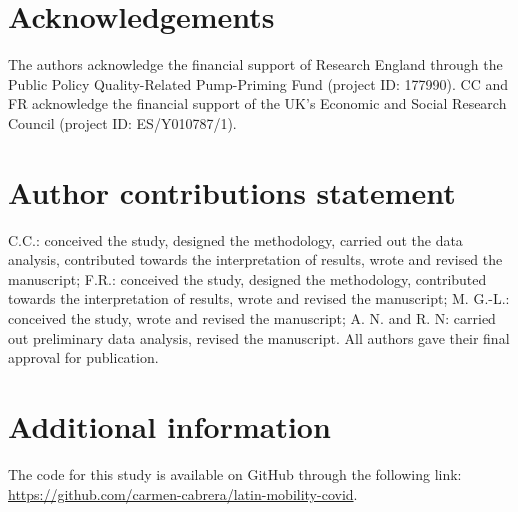 \documentclass[fleqn,10pt]{wlscirep}
\begin{document}


\section*{Acknowledgements}

The authors acknowledge the financial support of Research England through the Public Policy Quality-Related Pump-Priming Fund (project ID: 177990). CC and FR acknowledge the financial support of the UK's Economic and Social Research Council (project ID: ES/Y010787/1).

\section*{Author contributions statement}

C.C.: conceived the study, designed the methodology, carried out the data analysis, contributed towards the interpretation of results, wrote and revised the manuscript; F.R.: conceived the study, designed the methodology, contributed towards the interpretation of results, wrote and revised the manuscript; M. G.-L.: conceived the study, wrote and revised the manuscript; A. N. and R. N: carried out preliminary data analysis, revised the manuscript. All authors gave their final approval for publication.

\section*{Additional information}

The code for this study is available on GitHub through the following link: \href{https://github.com/carmen-cabrera/latin-mobility-covid}{https://github.com/carmen-cabrera/latin-mobility-covid}.
\end{document}

